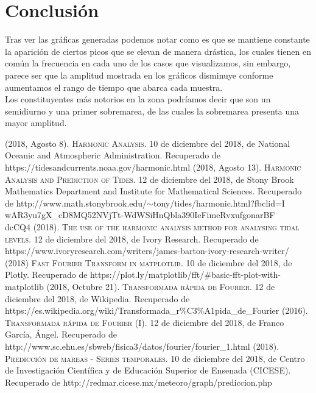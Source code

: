 \documentclass[12pt]{article}
\begin{document}
\section{Conclusión}

\noindent Tras ver las gráficas generadas podemos notar como es que se mantiene constante la aparición de ciertos picos que se elevan de manera drástica, los cuales tienen en común la frecuencia en cada uno de los casos que visualizamos, sin embargo, parece ser que la amplitud mostrada en los gráficos disminuye conforme aumentamos el rango de tiempo que abarca cada muestra. \\
\indent Los constituyentes más notorios en la zona podríamos decir que son un semidiurno y una primer sobremarea, de las cuales la sobremarea presenta una mayor amplitud.

\begin{thebibliography}{9}
	 (2018, Agosto 8). \textsc{Harmonic Analysis}. 10 de diciembre del 2018, de National Oceanic and Atmospheric Administration. Recuperado de https://tidesandcurrents.noaa.gov/harmonic.html
	 (2018, Agosto 13). \textsc{Harmonic Analysis and Prediction of Tides}. 12 de diciembre del 2018, de Stony Brook Mathematics Department and Institute for Mathematical Sciences. Recuperado de http://www.math.stonybrook.edu/$\sim$tony/tides/harmonic.html?fbclid=I\\wAR3yu7gX\_cD8MQ52NVjTt-WdWSiHnQbla390IeFimeRvxufgonarBF\\dcCQ4
	 (2018). \textsc{The use of the harmonic analysis method for analysing tidal levels}. 12 de diciembre del 2018, de Ivory Research. Recuperado de https://www.ivoryresearch.com/writers/james-barton-ivory-research-writer/
	 (2018) \textsc{Fast Fourier Transform in matplotlib}. 10 de diciembre del 2018, de Plotly. Recuperado de https://plot.ly/matplotlib/fft/\#basic-fft-plot-with-matplotlib
	 (2018, Octubre 21). \textsc{Transformada rápida de Fourier}. 12 de diciembre del 2018, de Wikipedia. Recuperado de https://es.wikipedia.org/wiki/Transformada\_r\%C3\%A1pida\_de\_Fourier
	 (2016). \textsc{Transformada rápida de Fourier (I)}. 12 de diciembre del 2018, de Franco García, Ángel. Recuperado de http://www.sc.ehu.es/sbweb/fisica3/datos/fourier/fourier\_1.html
	 (2018). \textsc{Predicción de mareas - Series temporales}. 10 de diciembre del 2018, de Centro de Investigación Científica y de Educación Superior de Ensenada (CICESE). Recuperado de http://redmar.cicese.mx/meteoro/graph/prediccion.php
\end{thebibliography}
\end{document}

